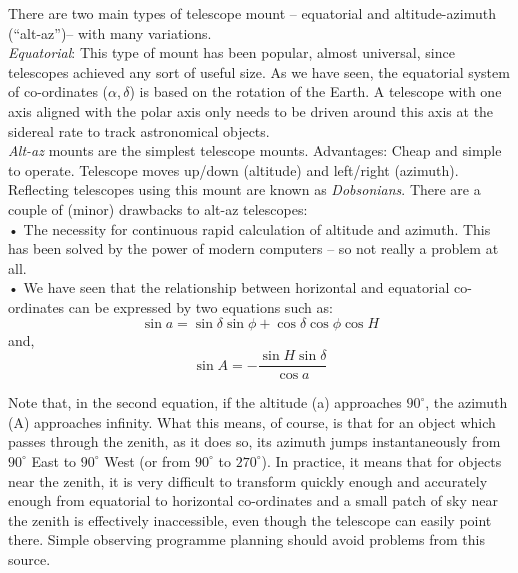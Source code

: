 \documentclass[a4paper,12pt]{extarticle}
\begin{document}
There are two main types of telescope mount – equatorial and altitude-azimuth (``alt-az'')– with many variations.\\

\textit{Equatorial}: This type of mount has been popular, almost universal, since telescopes achieved any sort of useful size. As we have seen, the equatorial system of co-ordinates ($\alpha, \delta$) is based on the rotation of the Earth. A telescope with one axis aligned with the polar axis only needs to be driven around this axis at the sidereal rate to track astronomical objects.\\

\textit{Alt-az} mounts are the simplest telescope mounts. Advantages: Cheap and simple to operate.
Telescope moves up/down (altitude) and left/right
(azimuth). Reflecting telescopes using this mount are known as \textit{Dobsonians}. There are a couple of (minor) drawbacks to alt-az telescopes:\\

• The necessity for continuous rapid calculation of altitude and azimuth. This has been solved by the power of modern computers – so not really a problem at all.\\
• We have seen that the relationship between horizontal and equatorial co-ordinates can be expressed by two equations such as:
\[\sin a=\sin \delta \sin \phi+\cos \delta \cos \phi \cos H\]
and,
\[\sin A=-\frac{\sin H \sin \delta}{\cos a}\]

Note that, in the second equation, if the altitude (a) approaches $90^\circ$, the azimuth (A) approaches infinity. What this means, of course, is that for an object which passes through the zenith, as it does so, its azimuth jumps instantaneously from $90^\circ$ East to $90^\circ$ West (or from $90^\circ$ to $270^\circ$). In practice, it means that for objects near the zenith, it is very difficult to transform quickly enough and accurately enough from equatorial to horizontal co-ordinates and a small patch of sky near the zenith is effectively inaccessible, even though the telescope can easily point there. Simple observing programme planning should avoid problems from this source.\\
\end{document}
